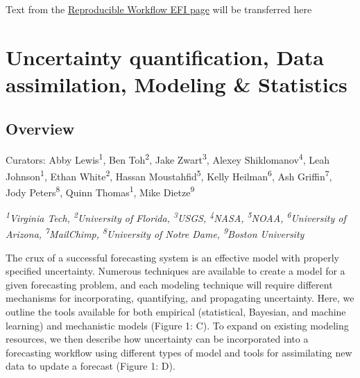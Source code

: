 \documentclass[
]{book}
\begin{document}
Text from the \href{https://ecoforecast.org/reproducible-forecasting-workflows/}{Reproducible Workflow EFI page} will be transferred here

\hypertarget{uncertainty-quantification-data-assimilation-modeling-statistics}{%
\chapter{Uncertainty quantification, Data assimilation, Modeling \& Statistics}\label{uncertainty-quantification-data-assimilation-modeling-statistics}}

\hypertarget{overview}{%
\section{Overview}\label{overview}}

Curators: Abby Lewis\textsuperscript{1}, Ben Toh\textsuperscript{2}, Jake Zwart\textsuperscript{3}, Alexey Shiklomanov\textsuperscript{4}, Leah Johnson\textsuperscript{1}, Ethan White\textsuperscript{2}, Hassan Moustahfid\textsuperscript{5}, Kelly Heilman\textsuperscript{6}, Ash Griffin\textsuperscript{7}, Jody Peters\textsuperscript{8}, Quinn Thomas\textsuperscript{1}, Mike Dietze\textsuperscript{9}

\emph{\textsuperscript{1}Virginia Tech, \textsuperscript{2}University of Florida, \textsuperscript{3}USGS, \textsuperscript{4}NASA, \textsuperscript{5}NOAA, \textsuperscript{6}University of Arizona, \textsuperscript{7}MailChimp, \textsuperscript{8}University of Notre Dame, \textsuperscript{9}Boston University}

The crux of a successful forecasting system is an effective model with properly specified uncertainty. Numerous techniques are available to create a model for a given forecasting problem, and each modeling technique will require different mechanisms for incorporating, quantifying, and propagating uncertainty. Here, we outline the tools available for both empirical (statistical, Bayesian, and machine learning) and mechanistic models (Figure 1: C). To expand on existing modeling resources, we then describe how uncertainty can be incorporated into a forecasting workflow using different types of model and tools for assimilating new data to update a forecast (Figure 1: D).
\end{document}
